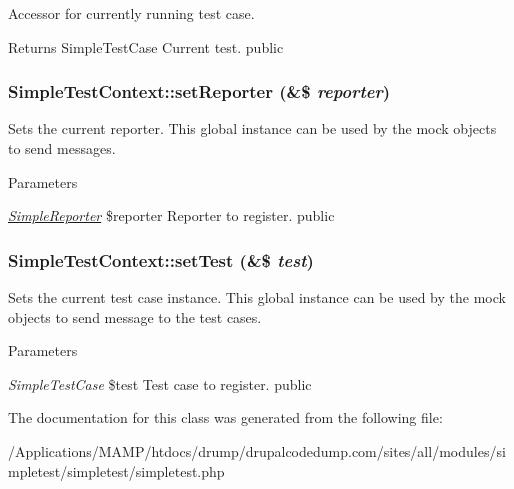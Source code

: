 \label{class_simple_test_context_ae92c4b08904579ecde5d440b8e8023cf}
Accessor for currently running test case. \begin{DoxyReturn}{Returns}
SimpleTestCase Current test.  public 
\end{DoxyReturn}
\hypertarget{class_simple_test_context_a9d8f37526e9d18cc89574ac861e66f3d}{
\subsubsection[{setReporter}]{\setlength{\rightskip}{0pt plus 5cm}SimpleTestContext::setReporter (\&\$ {\em reporter})}}
\label{class_simple_test_context_a9d8f37526e9d18cc89574ac861e66f3d}
Sets the current reporter. This global instance can be used by the mock objects to send messages. 
\begin{DoxyParams}{Parameters}
\item[{\em \hyperlink{class_simple_reporter}{SimpleReporter}}]\$reporter Reporter to register.  public \end{DoxyParams}
\hypertarget{class_simple_test_context_a8ceb3b2b4c27afbeea1957498015f636}{
\subsubsection[{setTest}]{\setlength{\rightskip}{0pt plus 5cm}SimpleTestContext::setTest (\&\$ {\em test})}}
\label{class_simple_test_context_a8ceb3b2b4c27afbeea1957498015f636}
Sets the current test case instance. This global instance can be used by the mock objects to send message to the test cases. 
\begin{DoxyParams}{Parameters}
\item[{\em SimpleTestCase}]\$test Test case to register.  public \end{DoxyParams}


The documentation for this class was generated from the following file:\begin{DoxyCompactItemize}
\item 
/Applications/MAMP/htdocs/drump/drupalcodedump.com/sites/all/modules/simpletest/simpletest/simpletest.php\end{DoxyCompactItemize}
